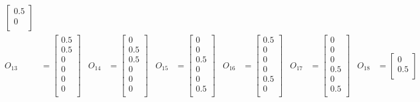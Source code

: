 \documentclass{mitschrift}
\begin{document}
\begin{align}
\begin{bmatrix}
        0.5 \\
        0 \\
    \end{bmatrix} \\
    O_{13} &= \begin{bmatrix}
        0.5 \\
        0.5 \\
        0 \\
        0 \\
        0 \\
        0 \\
    \end{bmatrix} & 
    O_{14} &= \begin{bmatrix}
        0 \\
        0.5 \\
        0.5 \\
        0 \\
        0 \\
        0 \\
    \end{bmatrix} & 
    O_{15} &= \begin{bmatrix}
        0 \\
        0 \\
        0.5 \\
        0 \\
        0 \\
        0.5 \\
    \end{bmatrix} & 
    O_{16} &= \begin{bmatrix}
        0.5 \\
        0 \\
        0 \\
        0 \\
        0.5 \\
        0 \\
    \end{bmatrix} & 
    O_{17} &= \begin{bmatrix}
        0 \\
        0 \\
        0 \\
        0.5 \\
        0 \\
        0.5 \\
    \end{bmatrix} & 
    O_{18} &= \begin{bmatrix}
        0 \\
        0.5 \\

\end{bmatrix}
\end{align}
\end{document}
